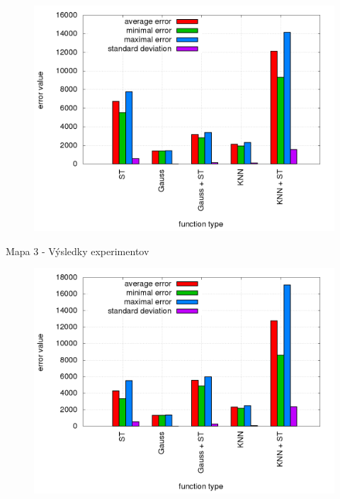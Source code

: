 \begin{figure}[!htb]
\centering
\includegraphics[scale=.36]{../../results_q_learning/map_2/trials_average_results.png}
\end{figure}


Mapa 3 - Výsledky experimentov

\begin{figure}[!htb]
\centering
\includegraphics[scale=.36]{../../results_q_learning/map_3/trials_average_results.png}
\end{figure}
